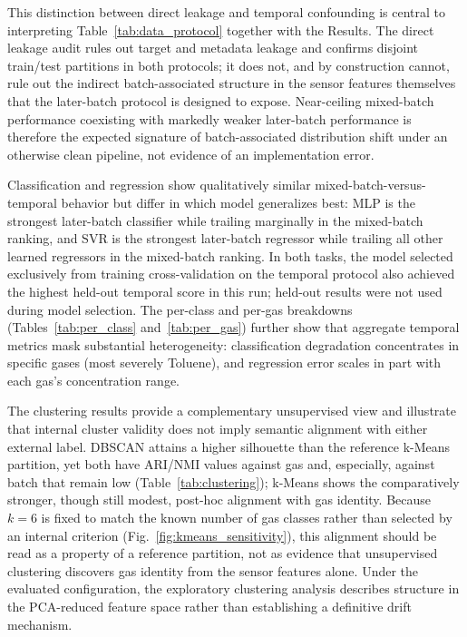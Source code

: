 \documentclass[conference]{IEEEtran}
\begin{document}
This distinction between direct leakage and temporal confounding is central to interpreting Table~\ref{tab:data_protocol} together with the Results. The direct leakage audit rules out target and metadata leakage and confirms disjoint train/test partitions in both protocols; it does not, and by construction cannot, rule out the indirect batch-associated structure in the sensor features themselves that the later-batch protocol is designed to expose. Near-ceiling mixed-batch performance coexisting with markedly weaker later-batch performance is therefore the expected signature of batch-associated distribution shift under an otherwise clean pipeline, not evidence of an implementation error.

Classification and regression show qualitatively similar mixed-batch-versus-temporal behavior but differ in which model generalizes best: MLP is the strongest later-batch classifier while trailing marginally in the mixed-batch ranking, and SVR is the strongest later-batch regressor while trailing all other learned regressors in the mixed-batch ranking. In both tasks, the model selected exclusively from training cross-validation on the temporal protocol also achieved the highest held-out temporal score in this run; held-out results were not used during model selection. The per-class and per-gas breakdowns (Tables~\ref{tab:per_class} and~\ref{tab:per_gas}) further show that aggregate temporal metrics mask substantial heterogeneity: classification degradation concentrates in specific gases (most severely Toluene), and regression error scales in part with each gas's concentration range.

The clustering results provide a complementary unsupervised view and illustrate that internal cluster validity does not imply semantic alignment with either external label. DBSCAN attains a higher silhouette than the reference k-Means partition, yet both have ARI/NMI values against gas and, especially, against batch that remain low (Table~\ref{tab:clustering}); k-Means shows the comparatively stronger, though still modest, post-hoc alignment with gas identity. Because $k=6$ is fixed to match the known number of gas classes rather than selected by an internal criterion (Fig.~\ref{fig:kmeans_sensitivity}), this alignment should be read as a property of a reference partition, not as evidence that unsupervised clustering discovers gas identity from the sensor features alone. Under the evaluated configuration, the exploratory clustering analysis describes structure in the PCA-reduced feature space rather than establishing a definitive drift mechanism.
\end{document}
